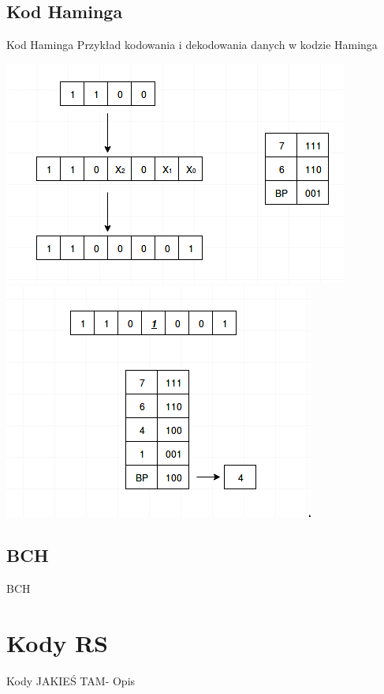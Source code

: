 \documentclass[12pt]{beamer}
\begin{document}
\subsection{Kod Haminga}
\begin{frame}{Kod Haminga}
Przykład kodowania i dekodowania danych w kodzie Haminga
\begin{center}
\includegraphics[scale= 0.30]{Haming/Kodowanie_Haming.png}
\includegraphics[scale=0.30]{Haming/Dekodowanie_Haming.png}
\end{center}
\end{frame}
\subsection{BCH}
\begin{frame}{BCH}


\end{frame}
	

\section{Kody RS}
\begin{frame}{Kody JAKIEŚ TAM- Opis}
\setcounter{section}{1}

\end{frame}
\end{document}

